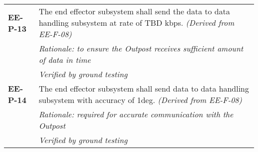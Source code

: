 \begin{longtable}{P{2cm}P{13.25cm}}
\textbf{EE-P-13}	& The end effector subsystem shall send the data to data handling subsystem at rate of \gls{TBD} \gls{kbps}. 
\textit{(Derived from EE-F-08)} \\
 & \textit{Rationale: to ensure the Outpost receives sufficient amount of data in time} \\
  & \textit{Verified by ground testing}				\\

\textbf{EE-P-14}	& The end effector subsystem shall send data to data handling subsystem with accuracy of 1\gls{deg}. 
\textit{(Derived from EE-F-08)} \\
& \textit{Rationale: required for accurate communication with the Outpost} \\
& \textit{Verified by ground testing}	
\end{longtable}